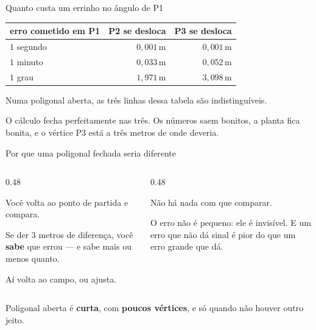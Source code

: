 \documentclass[aspectratio=169,11pt]{beamer}
\newcommand{\bnum}[1]{\textbf{\textcolor{mTeal}{#1}}}
\begin{document}
\begin{frame}{Quanto custa um errinho no ângulo de P1}
  \centering
  \small
  \renewcommand{\arraystretch}{1.4}
  \begin{tabular}{lrr}
    \toprule
    erro cometido em P1 & P2 se desloca & P3 se desloca \\
    \midrule
    $1$ segundo & $0{,}001$\,m & $0{,}001$\,m \\
    $1$ minuto & $0{,}033$\,m & $0{,}052$\,m \\
    \alert{$1$ grau} & \alert{$1{,}971$\,m} & \alert{$3{,}098$\,m} \\
    \bottomrule
  \end{tabular}
  \bigskip

  \begin{armadilha}[title={O detalhe assustador}]
    Numa poligonal aberta, \alert{as três linhas dessa tabela são indistinguíveis}.
    \medskip

    O cálculo fecha perfeitamente nas três. Os números saem bonitos, a planta fica bonita, e
    o vértice P3 está a três metros de onde deveria.
  \end{armadilha}
\end{frame}

\begin{frame}{Por que uma poligonal fechada seria diferente}
  \begin{columns}[T]
    \begin{column}{0.48\textwidth}
      \begin{ideia}[title={Na fechada}]
        Você volta ao ponto de partida e compara.
        \medskip

        Se der $3$ metros de diferença, você \bnum{sabe} que errou --- e sabe mais ou menos
        quanto.
        \medskip

        Aí volta ao campo, ou ajusta.
      \end{ideia}
    \end{column}
    \begin{column}{0.48\textwidth}
      \begin{armadilha}[title={Na aberta}]
        Não há nada com que comparar.
        \medskip

        O erro \alert{não é pequeno}: ele é \alert{invisível}. E um erro que não dá sinal é
        pior do que um erro grande que dá.
      \end{armadilha}
    \end{column}
  \end{columns}
  \bigskip
  \centering
  \begin{ideia}[title={A regra de ouro}]
    Poligonal aberta é \bnum{curta}, com \bnum{poucos vértices}, e só quando não houver
    outro jeito.
  \end{ideia}
\end{frame}
\end{document}
